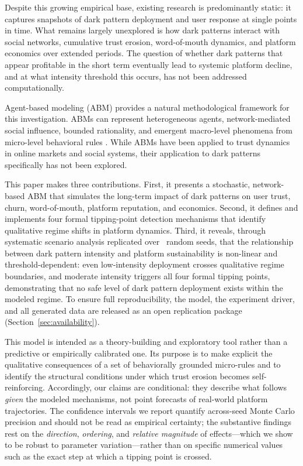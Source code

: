 \documentclass[a4paper,fleqn]{cas-sc}
\begin{document}
Despite this growing empirical base, existing research is predominantly static: it captures snapshots of dark pattern deployment and user response at single points in time. What remains largely unexplored is how dark patterns interact with social networks, cumulative trust erosion, word-of-mouth dynamics, and platform economics over extended periods. The question of whether dark patterns that appear profitable in the short term eventually lead to systemic platform decline, and at what intensity threshold this occurs, has not been addressed computationally.

Agent-based modeling (ABM) provides a natural methodological framework for this investigation. ABMs can represent heterogeneous agents, network-mediated social influence, bounded rationality, and emergent macro-level phenomena from micro-level behavioral rules \citep{mesa2024}. While ABMs have been applied to trust dynamics in online markets and social systems, their application to dark patterns specifically has not been explored.

This paper makes three contributions. First, it presents a stochastic, network-based ABM that simulates the long-term impact of dark patterns on user trust, churn, word-of-mouth, platform reputation, and economics. Second, it defines and implements four formal tipping-point detection mechanisms that identify qualitative regime shifts in platform dynamics. Third, it reveals, through systematic scenario analysis replicated over \numReplicates\ random seeds, that the relationship between dark pattern intensity and platform sustainability is non-linear and threshold-dependent: even low-intensity deployment crosses qualitative regime boundaries, and moderate intensity triggers all four formal tipping points, demonstrating that no safe level of dark pattern deployment exists within the modeled regime. To ensure full reproducibility, the model, the experiment driver, and all generated data are released as an open replication package (Section~\ref{sec:availability}).

This model is intended as a theory-building and exploratory tool rather than a predictive or empirically calibrated one. Its purpose is to make explicit the qualitative consequences of a set of behaviorally grounded micro-rules and to identify the structural conditions under which trust erosion becomes self-reinforcing. Accordingly, our claims are conditional: they describe what follows \emph{given} the modeled mechanisms, not point forecasts of real-world platform trajectories. The confidence intervals we report quantify across-seed Monte Carlo precision and should not be read as empirical certainty; the substantive findings rest on the \emph{direction}, \emph{ordering}, and \emph{relative magnitude} of effects---which we show to be robust to parameter variation---rather than on specific numerical values such as the exact step at which a tipping point is crossed.
\end{document}
